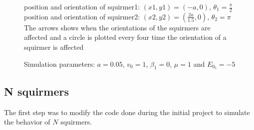\documentclass{article}
\begin{document}
\begin{figure}[H]
\begin{minipage}{0.49\textwidth}
        \caption{\footnotesize Simulation parameters: $a=0.05$, $v_0=1$, $\beta_1=0$, $\mu=1$ and $E_{0_{5}}=-5$}
    \end{minipage}
    position and orientation of squirmer1: $(x1,y1)=(-a,0)$, $\theta_1=\frac{\pi}{2}$\\
    position and orientation of squirmer2: $(x2,y2)=(\frac{2a}{1.5},0)$, $\theta_2=\pi$\\
    The arrows shows when the orientations of the squirmers are affected and a circle is plotted every four time the orientation of a squirmer is affected
\end{figure}

\subsection{N squirmers}
The first step was to modify the code done during the initial project to simulate the behavior of $N$ squirmers.

\newpage

\nocite{*}


\end{document}
